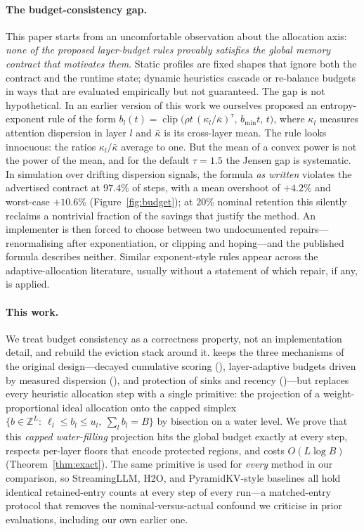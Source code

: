 \paragraph{The budget-consistency gap.}
This paper starts from an uncomfortable observation about the allocation
axis: \emph{none of the proposed layer-budget rules provably satisfies the
global memory contract that motivates them}. Static profiles are fixed
shapes that ignore both the contract and the runtime state; dynamic
heuristics cascade or re-balance budgets in ways that are evaluated
empirically but not guaranteed. The gap is not hypothetical. In an earlier
version of this work we ourselves proposed an entropy-exponent rule of the
form
$b_l(t)=\operatorname{clip}\!\bigl(\rho t\,(\kappa_l/\bar\kappa)^{\tau},
\,b_{\min}t,\,t\bigr)$,
where $\kappa_l$ measures attention dispersion in layer $l$ and
$\bar\kappa$ is its cross-layer mean. The rule looks innocuous: the
ratios $\kappa_l/\bar\kappa$ average to one. But the mean of a convex
power is not the power of the mean, and for the default $\tau=1.5$ the
Jensen gap is systematic. In simulation over drifting dispersion signals,
the formula \emph{as written} violates the advertised contract at
$97.4\%$ of steps, with a mean overshoot of $+4.2\%$ and worst-case
$+10.6\%$ (Figure~\ref{fig:budget}); at $20\%$ nominal retention this
silently reclaims a nontrivial fraction of the savings that justify the
method. An implementer is then forced to choose between two undocumented
repairs---renormalising after exponentiation, or clipping and hoping---and
the published formula describes neither. Similar exponent-style rules
appear across the adaptive-allocation literature, usually without a
statement of which repair, if any, is applied.

\paragraph{This work.}
We treat budget consistency as a correctness property, not an
implementation detail, and rebuild the eviction stack around it.
\sage{} keeps the three mechanisms of the original design---decayed
cumulative scoring (\acs{}), layer-adaptive budgets driven by measured
dispersion (\laba{}), and protection of sinks and recency (\dre{})---but
replaces every heuristic allocation step with a single primitive: the
projection of a weight-proportional ideal allocation onto the capped
simplex $\{b\in\mathbb{Z}^L:\ \ell_l\le b_l\le u_l,\ \sum_l b_l=B\}$ by
bisection on a water level. We prove that this \emph{capped water-filling}
projection hits the global budget exactly at every step, respects
per-layer floors that encode protected regions, and costs
$O(L\log B)$ (Theorem~\ref{thm:exact}). The same primitive is used for
\emph{every} method in our comparison, so StreamingLLM, H2O, and
PyramidKV-style baselines all hold identical retained-entry counts at
every step of every run---a matched-entry protocol that removes the
nominal-versus-actual confound we criticise in prior evaluations,
including our own earlier one.

